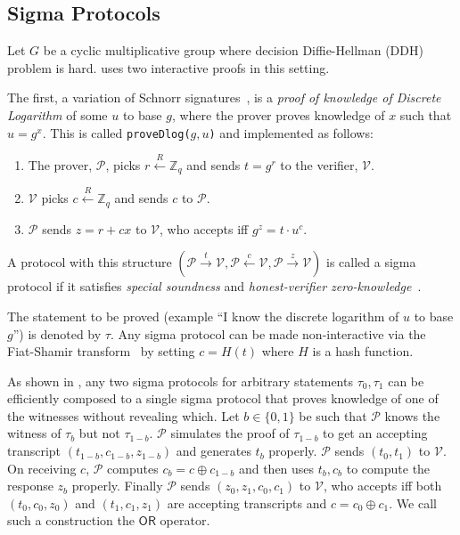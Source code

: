 \documentclass[runningheads]{llncs}
\newcommand{\ornode}{\ensuremath{\mathsf{OR}}}
\begin{document}
\subsection{Sigma Protocols} 

Let $G$ be a cyclic multiplicative group where decision Diffie-Hellman (DDH) problem is hard. 
\algname uses two interactive proofs in this setting. 

The first, a variation of Schnorr signatures~\cite{Sch91}, is a {\em proof of knowledge of Discrete Logarithm} of some $u$ to base $g$, where the prover proves knowledge of $x$ such that $u = g^x$. This is called \texttt{proveDlog($g, u$)} and implemented as follows:
\begin{enumerate}
	\item The prover, $\mathcal{P}$, picks $r \stackrel{R}{\leftarrow} \mathbb{Z}_q$ and sends $t = g^r$ to the verifier, $\mathcal{V}$.
	\item $\mathcal{V}$ picks $c \stackrel{R}{\leftarrow} \mathbb{Z}_q$ and sends $c$ to $\mathcal{P}$.
	\item $\mathcal{P}$ sends $z = r + cx$ to $\mathcal{V}$, who accepts iff ${g}^z = t\cdot {u}^c$. 
	
\end{enumerate}

A protocol with this structure $(\mathcal{P} \stackrel{t}{\rightarrow}\mathcal{V}, \mathcal{P} \stackrel{c}{\leftarrow}\mathcal{V}, \mathcal{P} \stackrel{z}{\rightarrow}\mathcal{V})$ is called a sigma protocol if it satisfies {\em special soundness} and {\em honest-verifier zero-knowledge}~\cite{Dam10}. 

The statement to be proved (example ``I know the discrete logarithm of $u$ to base $g$'') is denoted by $\tau$.
Any sigma protocol can be made non-interactive via the Fiat-Shamir transform~\cite{fiatshamir} by setting $c= H(t)$ where $H$ is a hash function. 

As shown in \cite{CDS94}, any two sigma protocols for arbitrary statements $\tau_0, \tau_1$ can be efficiently composed to a single sigma protocol that proves knowledge of one of the witnesses without revealing which. Let $b \in \{0, 1\}$ be such that $\mathcal{P}$ knows the witness of $\tau_{b}$ but not $\tau_{1-b}$. 
$\mathcal{P}$ simulates the proof of $\tau_{1-b}$ to get an accepting transcript $(t_{1-b}, c_{1-b}, z_{1-b})$ and generates $t_b$ properly. $\mathcal{P}$ sends $(t_0, t_1)$ to $\mathcal{V}$. On receiving $c$, $\mathcal{P}$ computes $c_b = c \oplus c_{1-b}$ and then uses $t_b, c_b$ to compute the response $z_b$ properly. Finally $\mathcal{P}$ sends $(z_0, z_1, c_0, c_1)$ to $\mathcal{V}$, who accepts iff both $(t_0, c_0, z_0)$ and $(t_1, c_1, z_1)$ are accepting transcripts and $c = c_0 \oplus c_1$.
We call such a construction the $\ornode$ operator. 
\end{document}

